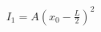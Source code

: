 \documentclass[preview]{standalone}
\begin{document}
\begin{align*}
I_1 = A\!\left(x_0 - \tfrac{L}{2}\right)^2
\end{align*}
\end{document}
